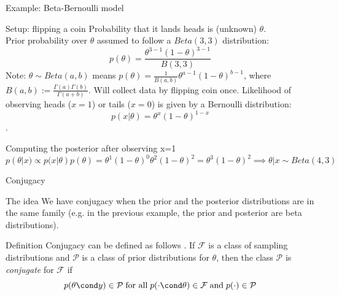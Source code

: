 \documentclass[10pt]{beamer}
\begin{document}
\begin{frame}{Example: Beta-Bernoulli model}

\begin{sblock}{Setup: flipping a coin}
Probability that it lands heads is (unknown) $\theta$. \\
Prior probability over $\theta$ assumed to follow a $Beta(3,3)$ distribution:
$$ p(\theta) = \frac{\theta^{3-1}(1-\theta)^{3-1}}{B(3,3)}$$
{\tiny Note: $\theta \sim Beta(a, b)$ means $p(\theta) = \frac{1}{B(a,b)}\theta^{a-1}(1-\theta)^{b-1}$, where $B(a,b):= \frac{\Gamma(a) \Gamma(b)}{\Gamma(a+b)}.$}
\vfill 
Will collect data by flipping coin once. Likelihood of observing heads ($x=1$) or tails ($x=0$) is given by a Bernoulli distribution:
$$p(x | \theta) = \theta^x(1-\theta)^{1-x} $$.
\end{sblock}
\begin{sblock}{Computing the posterior after observing x=1}
$$p(\theta| x) \propto p(x | \theta) p(\theta) = \theta^1(1-\theta)^{0}  \theta^{2}(1-\theta)^{2}  = \theta^3 (1-\theta)^2 \implies \theta | x \sim Beta(4,3)$$
\end{sblock}

\end{frame}


\begin{frame}{Conjugacy}

\begin{sblock}{The idea}
We have conjugacy when the prior and the posterior distributions are in the same family (e.g. in the previous example, the prior and posterior are beta distributions).
\end{sblock}

\begin{sblock}{Definition}
Conjugacy can be defined as follows \cite{gelman2013bayesian}. If $\mathcal{F}$ is a class of sampling distributions and $\mathcal{P}$ is a class of prior distributions for $\theta$, then the class $\mathcal{P}$ is \textit{conjugate} for $\mathcal{F}$ if
\[  p(\theta \cond y ) \in \mathcal{P} \; \text{for all} \; p(\cdot \cond \theta) \in \mathcal{F} \; \text{and} \; p(\cdot) \in \mathcal{P} \]
\end{sblock}

\end{frame}


\end{document}

